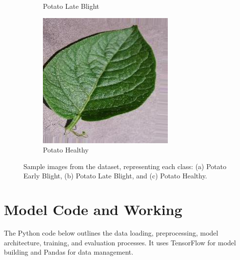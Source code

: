 \documentclass{article}
\begin{document}
\begin{figure}[h]
\begin{subfigure}[b]{0.32\textwidth}
        \caption{Potato Late Blight}
        \label{fig:late_blight}
    \end{subfigure}
    \hfill
    \begin{subfigure}[b]{0.32\textwidth}
        \centering
        \includegraphics[width=\textwidth]{healthy_sample.png}
        \caption{Potato Healthy}
        \label{fig:healthy}
    \end{subfigure}
    \caption{Sample images from the dataset, representing each class: (a) Potato Early Blight, (b) Potato Late Blight, and (c) Potato Healthy.}
    \label{fig:dataset_samples}
\end{figure}

\section{Model Code and Working}
The Python code below outlines the data loading, preprocessing, model architecture, training, and evaluation processes. It uses TensorFlow for model building and Pandas for data management.
\end{document}
